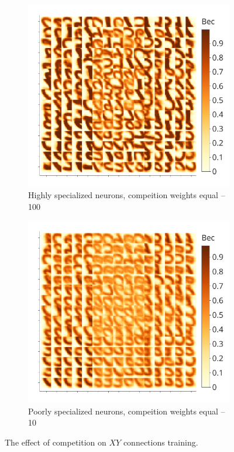 \documentclass[a4paper,10pt]{article}
\begin{document}
\begin{figure}
\centering
\begin{subfigure}{0.45\textwidth}
    \includegraphics[width=\textwidth,keepaspectratio=true]{weights_XY_good_ru.pdf}
    \caption{Highly specialized neurons, compeition weights equal --100}
    \label{fig:high_comp}
\end{subfigure}
\begin{subfigure}{0.45\textwidth}
    \includegraphics[width=\textwidth,keepaspectratio=true]{weights_XY_bad_ru.pdf}
    \caption{Poorly specialized neurons, compeition weights equal --10}
    \label{fig:low_comp}
\end{subfigure}
\caption{The effect of competition on $ XY $ connections training.}
\label{competition-training-importance}
\end{figure}
\end{document}
